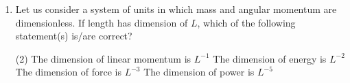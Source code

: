 
\begin{enumerate}
    \item Let us consider a system of units in which mass and angular momentum are dimensionless. If length has dimension of \( L \), which of the following statement(s) is/are correct?
        \begin{tasks}(2)
            \task The dimension of linear momentum is \( L^{-1} \)
            \task The dimension of energy is \( L^{-2} \)
            \task The dimension of force is \( L^{-3} \)
            \task The dimension of power is \( L^{-5} \)
        \end{tasks}
\end{enumerate}
